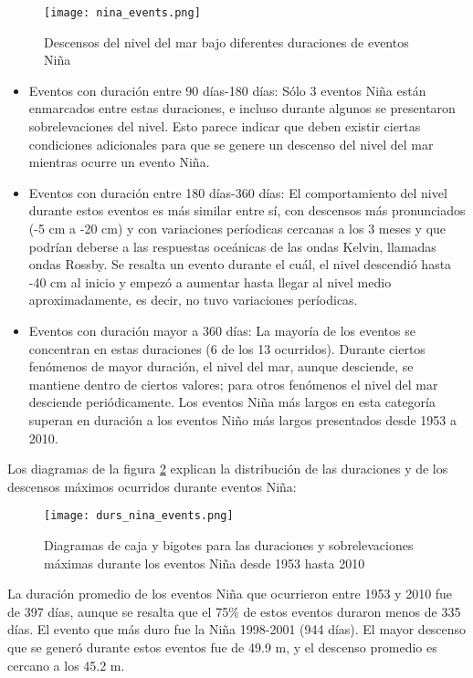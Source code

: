 \begin{figure}[H]
	\centering
	\texttt{[image: nina\_events.png]}
	\caption{Descensos del nivel del mar bajo diferentes duraciones de eventos Niña}
	\label{fig:nina_events}
\end{figure}

\begin{itemize}
	\item Eventos con duración entre 90 días-180 días: Sólo 3 eventos Niña están enmarcados entre estas duraciones, e incluso durante algunos se presentaron sobrelevaciones del nivel. Esto parece indicar que deben existir ciertas condiciones adicionales para que se genere un descenso del nivel del mar mientras ocurre un evento Niña. 
	
	\item Eventos con duración entre 180 días-360 días: El comportamiento del nivel durante estos eventos es más similar entre sí, con descensos más pronunciados (-5 cm a -20 cm) y con variaciones períodicas cercanas a los 3 meses y que podrían deberse a las respuestas oceánicas de las ondas Kelvin, llamadas ondas Rossby. Se resalta un evento durante el cuál, el nivel descendió hasta -40 cm al inicio y empezó a aumentar hasta llegar al nivel medio aproximadamente, es decir, no tuvo variaciones períodicas.
	
	\item Eventos con duración mayor a 360 días: La mayoría de los eventos se concentran en estas duraciones (6 de los 13 ocurridos). Durante ciertos fenómenos de mayor duración, el nivel del mar, aunque desciende, se mantiene dentro de ciertos valores; para otros fenómenos el nivel del mar desciende periódicamente. Los eventos Niña más largos en esta categoría superan en duración a los eventos Niño más largos presentados desde 1953 a 2010. 
	
\end{itemize}

Los diagramas de la figura \ref{fig:durs_nina} explican la distribución de las duraciones y de los descensos máximos ocurridos durante eventos Niña:

\begin{figure}[h]
	\centering
	\texttt{[image: durs\_nina\_events.png]}
	\caption{Diagramas de caja y bigotes para las duraciones y sobrelevaciones máximas durante los eventos Niña desde 1953 hasta 2010}
	\label{fig:durs_nina}
\end{figure}

La duración promedio de los eventos Niña que ocurrieron entre 1953 y 2010 fue de 397 días, aunque se resalta que el 75\% de estos eventos duraron menos de 335 días. El evento que más duro fue la Niña 1998-2001 (944 días). El mayor descenso que se generó durante estos eventos fue de 49.9 m, y el descenso promedio es cercano a los 45.2 m.

